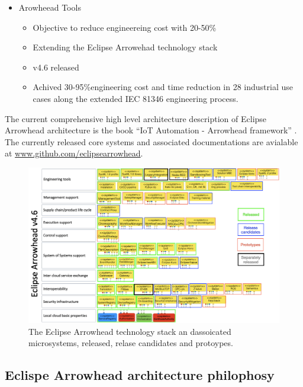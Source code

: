 \documentclass[a4paper]{arrowhead}
\begin{document}
\begin{itemize}
\begin{itemize}
      
    \item Arowheead Tools
      \begin{itemize}
      \item Objective to reduce engineereing cost with 20-50\%
      \item Extending the Eclipse Arrowehad technology stack
      \item v4.6 released
      \item Achived 30-95\%engineering cost and time reduction in 28
        industrial use cases along the extended IEC 81346 engineering process. 
      \end{itemize}
    \end{itemize}
\end{itemize}


 The current comprehensive high level architecture description of
 Eclipse Arrowhead architecture is the book ``IoT Automation -
 Arrowhead framework''  \cite{Delsing2017a}. The currently released
 core systems and associated documentations
 are avialable at \url{www.github.com/eclipsearrowhead}.

 \begin{figure}[ht!]
   \centering
   \includegraphics[width=0.9\linewidth]{figures/arrowhead_technology_stack}
   \caption{The Eclipse Arrowhead technology stack an dassoicated
     microsystems, released, relase candidates and protoypes.}
   \label{fig:technology_stack}
 \end{figure}

\subsection{Eclispe Arrowhead architecture philophosy}
\label{sec:use}
\end{document}
